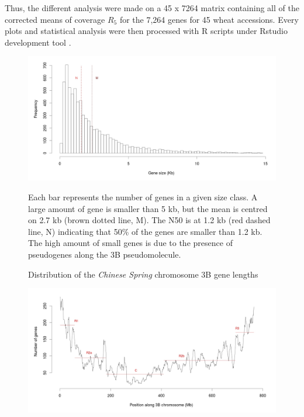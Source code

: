 \documentclass[a4paper, 12pt]{article}
\begin{document}
\begin{onehalfspace}
Thus, the different analysis were made on a 45 x 7264 matrix containing all of the corrected means of coverage $R_{5}$ for the 7,264 genes for 45 wheat accessions. Every plots and statistical analysis were then processed with R scripts under Rstudio development tool \citep{Ihaka1996}.

\newpage 
\thispagestyle{empty}
    \begin{figure}
    \vspace{-1.5cm}
      \centering \includegraphics[scale=0.19]{Figures/Figure_4.jpg}
      \vspace{0.5cm}
      \caption{Distribution of the \textit{Chinese Spring} chromosome 3B gene lengths} 
      \label{fig:F4}
\footnotesize{Each bar represents the number of genes in a given size class. A large amount of gene is smaller than 5 kb, but the mean is centred on 2.7 kb (brown dotted line, M). The N50 is at 1.2 kb (red dashed line, N) indicating that 50\% of the genes are smaller than 1.2 kb. The high amount of small genes is due to the presence of pseudogenes along the 3B pseudomolecule.}
    \end{figure}
    \begin{figure}
    \vspace{-0.7cm}
      \centering \includegraphics[scale=0.19]{Figures/Figure_5.jpg}

\end{figure}
\end{onehalfspace}
\end{document}
